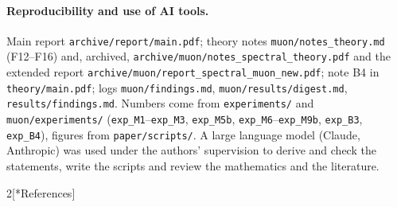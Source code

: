 \documentclass[10pt]{article}
\makeatletter
\renewcommand\section{\@startsection{section}{1}{\z@}{-2.4ex \@plus -0.6ex \@minus -.2ex}{1.2ex \@plus .2ex}{\normalfont\large\bfseries}}
\theoremstyle{remark}
\makeatother
\begin{document}
\paragraph{Reproducibility and use of AI tools.} Main report \nolinkurl{archive/report/main.pdf}; theory notes
\nolinkurl{muon/notes_theory.md} (F12--F16) and, archived, \nolinkurl{archive/muon/notes_spectral_theory.pdf} and the
extended report \nolinkurl{archive/muon/report_spectral_muon_new.pdf}; note B4 in \nolinkurl{theory/main.pdf}; logs
\nolinkurl{muon/findings.md}, \nolinkurl{muon/results/digest.md}, \nolinkurl{results/findings.md}. Numbers come from
\nolinkurl{experiments/} and \nolinkurl{muon/experiments/} (\texttt{exp\_M1}--\texttt{exp\_M3}, \texttt{exp\_M5b},
\texttt{exp\_M6}--\texttt{exp\_M9b}, \texttt{exp\_B3}, \texttt{exp\_B4}), figures from \nolinkurl{paper/scripts/}. A large
language model (Claude, Anthropic) was used under the authors' supervision to derive and check the statements, write the
scripts and review the mathematics and the literature.

{\footnotesize\setlength{\columnsep}{1.6em}
\begin{multicols}{2}[\section*{References}]
\sloppy


\end{multicols}
}

\ifdefined\WithExplanatoryFigures\fi
\end{document}
